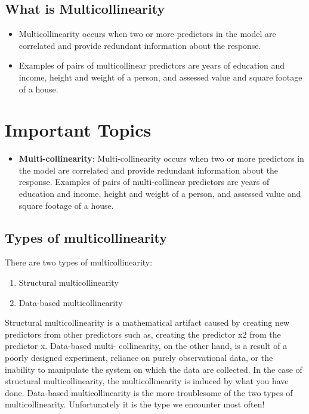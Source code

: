 \documentclass[a4paper,12pt]{article}
\begin{document}
\subsection*{What is Multicollinearity}
\begin{itemize}

\item Multicollinearity occurs when two or more predictors in the model are correlated
and provide redundant information about the response.
\item  Examples of pairs of multicollinear predictors are years of education and income, height and weight of a
person, and assessed value and square footage of a house.

\end{itemize}



\section{Important Topics}

\begin{itemize}
\item \textbf{Multi-collinearity}: Multi-collinearity occurs when two or more predictors in the model are
correlated and provide redundant information about the response. Examples of pairs of multi-collinear predictors are years of education and income, height and weight of a person, and assessed value and square footage
of a house.

\end{itemize}



\subsection{Types of multicollinearity}
There are two types of multicollinearity:
\begin{enumerate}
\item Structural multicollinearity
\item Data-based multicollinearity
\end{enumerate}
Structural multicollinearity is a mathematical artifact caused by creating new predictors from
other predictors such as, creating the predictor x2 from the predictor x. Data-based multi-
collinearity, on the other hand, is a result of a poorly designed experiment, reliance on purely
observational data, or the inability to manipulate the system on which the data are collected.
In the case of structural multicollinearity, the multicollinearity is induced by what you have
done. Data-based multicollinearity is the more troublesome of the two types of multicollinearity.
Unfortunately it is the type we encounter most often!
\end{document}
